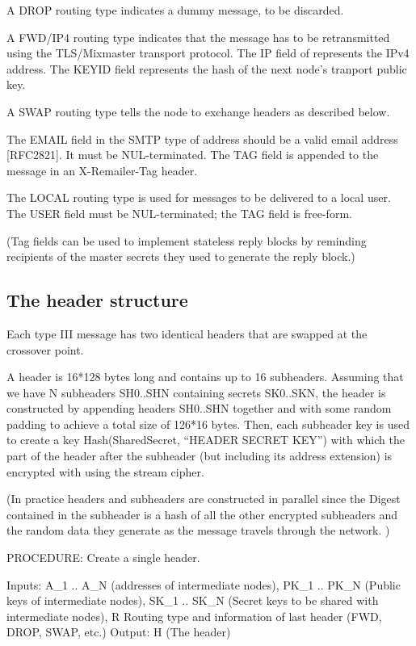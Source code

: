 A DROP routing type indicates a dummy message, to be discarded.

A FWD/IP4 routing type indicates that the message has to be
retransmitted using the TLS/Mixmaster transport protocol. The IP field
of represents the IPv4 address.  The KEYID field represents the hash of
the next node's tranport public key.

A SWAP routing type tells the node to exchange headers as described below.

The EMAIL field in the SMTP type of address should be a valid email
address [RFC2821].  It must be NUL-terminated.  The TAG field is
appended to the message in an X-Remailer-Tag header.

The LOCAL routing type is used for messages to be delivered to a local
user.  The USER field must be NUL-terminated; the TAG field is
free-form.

(Tag fields can be used to  implement stateless reply blocks by
reminding recipients of the master secrets they used to generate the
reply block.)

\subsection{The header structure}

Each type III message has two identical headers that are swapped at
the crossover point.

A header is 16*128 bytes long and contains up to 16
subheaders. Assuming that we have N subheaders SH0..SHN containing
secrets SK0..SKN, the header is constructed by appending headers
SH0..SHN together and with some random padding to achieve a total size
of 126*16 bytes. Then, each subheader key is used to create a key
Hash(SharedSecret, ``HEADER SECRET KEY'') with which the part of the
header after the subheader (but including its address extension) is
encrypted with using the stream cipher. 

(In practice headers and subheaders are constructed in parallel since
the Digest contained in the subheader is a hash of all the other
encrypted subheaders and the random data they generate as the message
travels through the network. )

PROCEDURE: Create a single header.

Inputs: A_1 .. A_N (addresses of intermediate nodes), 
	PK_1 .. PK_N (Public keys of intermediate nodes),
	SK_1 .. SK_N (Secret keys to be shared with intermediate nodes),
        R Routing type and information of last header (FWD, DROP, SWAP, etc.)
Output: H (The header)

